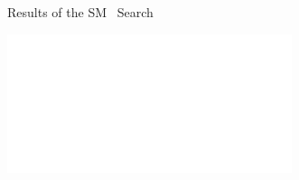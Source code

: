 \documentclass[11pt, xcolor={dvipsnames}, aspectratio=169, notes]{beamer}
\begin{document}
\begin{frame}[standout]
  Results of the SM~\allbold{\HH} Search

  \vspace*{1.5em}

  \includegraphics[scale=1.0]{feynman_graphs/di_higgs_box_inverted}%
  \hspace*{2em}%
\end{frame}



\end{document}
